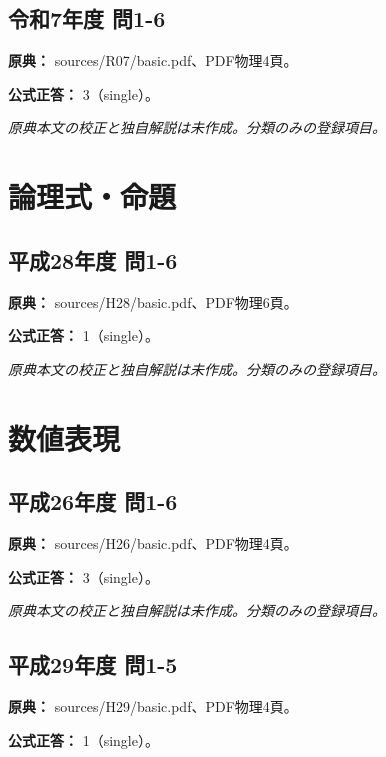 \subsection{令和7年度 問1-6}
\label{q:r07-reg-basic-1-6}

\noindent\textbf{原典：} sources/R07/basic.pdf、PDF物理4頁。

\textbf{公式正答：} 3（single）。

\par\textit{原典本文の校正と独自解説は未作成。分類のみの登録項目。}

\section{論理式・命題}

\subsection{平成28年度 問1-6}
\label{q:h28-reg-basic-1-6}

\noindent\textbf{原典：} sources/H28/basic.pdf、PDF物理6頁。

\textbf{公式正答：} 1（single）。

\par\textit{原典本文の校正と独自解説は未作成。分類のみの登録項目。}

\section{数値表現}

\subsection{平成26年度 問1-6}
\label{q:h26-reg-basic-1-6}

\noindent\textbf{原典：} sources/H26/basic.pdf、PDF物理4頁。

\textbf{公式正答：} 3（single）。

\par\textit{原典本文の校正と独自解説は未作成。分類のみの登録項目。}

\subsection{平成29年度 問1-5}
\label{q:h29-reg-basic-1-5}

\noindent\textbf{原典：} sources/H29/basic.pdf、PDF物理4頁。

\textbf{公式正答：} 1（single）。

